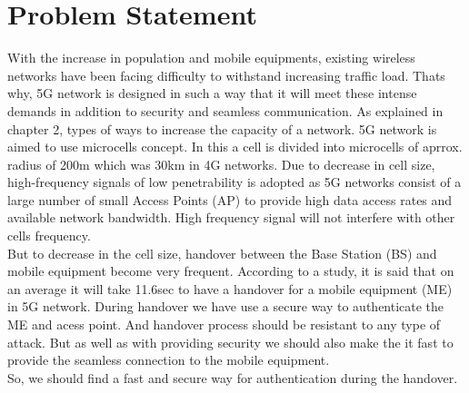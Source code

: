 \chapter{Problem Statement}


{
    With the increase in population and mobile equipments, existing wireless networks 
    have been facing difficulty to withstand increasing traffic load. Thats why,
    5G network is designed in such a way that it will meet these intense demands 
    in addition to security and seamless communication.
    As explained in chapter 2, types of ways to increase the capacity of a network.
    5G network is aimed to use microcells concept. In this a cell is divided into microcells of 
    aprrox. radius of 200m which was 30km in 4G networks. Due to decrease in cell size, 
    high-frequency signals of low penetrability is adopted as 5G networks consist
    of a large number of small Access Points (AP) to provide high data access rates 
    and available network bandwidth. High frequency signal will not interfere with 
    other cells frequency.\\

    But to decrease in the cell size, handover between the Base Station (BS) 
    and mobile equipment become
    very frequent. According to a study, it is said that on an average it will take
    11.6sec to have a handover for a mobile equipment (ME) in 5G network. During handover
    we have use a secure way to authenticate the ME and acess point. And handover
    process should be resistant to any type of attack. But as well as with providing
    security we should also make the it fast to provide the seamless connection to the 
    mobile equipment.\\

    So, we should find a fast and secure way for authentication during the handover.
    
    
}